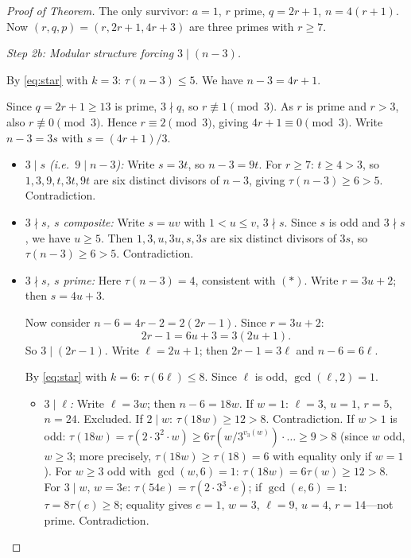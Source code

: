 \documentclass[11pt]{article}
\begin{document}
\begin{proof}[Proof of Theorem]
The only survivor: $a = 1$, $r$ prime, $q = 2r + 1$, $n = 4(r + 1)$.
Now $(r, q, p) = (r, 2r+1, 4r+3)$ are three primes with $r \ge 7$.

\medskip
\noindent\textit{Step 2b: Modular structure forcing $3 \mid (n - 3)$.}

By \eqref{eq:star} with $k = 3$: $\tau(n - 3) \le 5$.  We have $n - 3 = 4r + 1$.

Since $q = 2r + 1 \ge 13$ is prime, $3 \nmid q$, so $r \not\equiv 1 \pmod 3$.
As $r$ is prime and $r > 3$, also $r \not\equiv 0 \pmod 3$.  Hence
$r \equiv 2 \pmod 3$, giving $4r + 1 \equiv 0 \pmod 3$.
Write $n - 3 = 3s$ with $s = (4r+1)/3$.

\begin{itemize}
\item \emph{$3 \mid s$ (i.e.\ $9 \mid n - 3$):}
  Write $s = 3t$, so $n - 3 = 9t$.  For $r \ge 7$: $t \ge 4 > 3$, so
  $1, 3, 9, t, 3t, 9t$ are six distinct divisors of $n - 3$, giving
  $\tau(n-3) \ge 6 > 5$.  Contradiction.

\item \emph{$3 \nmid s$, $s$ composite:}
  Write $s = uv$ with $1 < u \le v$, $3 \nmid s$.  Since $s$ is odd and
  $3 \nmid s$, we have $u \ge 5$.
  Then $1, 3, u, 3u, s, 3s$ are six distinct divisors of $3s$, so
  $\tau(n - 3) \ge 6 > 5$.  Contradiction.

\item \emph{$3 \nmid s$, $s$ prime:}
  Here $\tau(n - 3) = 4$, consistent with $(*)$.  Write $r = 3u + 2$; then
  $s = 4u + 3$.

  Now consider $n - 6 = 4r - 2 = 2(2r - 1)$.  Since $r = 3u + 2$:
  \[
    2r - 1 = 6u + 3 = 3(2u + 1).
  \]
  So $3 \mid (2r - 1)$.  Write $\ell = 2u + 1$; then $2r - 1 = 3\ell$ and
  $n - 6 = 6\ell$.

  By \eqref{eq:star} with $k = 6$: $\tau(6\ell) \le 8$.
  Since $\ell$ is odd, $\gcd(\ell, 2) = 1$.

  \begin{itemize}
  \item \emph{$3 \mid \ell$:} Write $\ell = 3w$; then $n - 6 = 18w$.
    If $w = 1$: $\ell = 3$, $u = 1$, $r = 5$, $n = 24$.  Excluded.
    If $2 \mid w$: $\tau(18w) \ge 12 > 8$.  Contradiction.
    If $w > 1$ is odd: $\tau(18w) = \tau(2 \cdot 3^2 \cdot w) \ge 6\tau(w/3^{v_3(w)})
    \cdot \ldots \ge 9 > 8$ (since $w$ odd, $w \ge 3$; more precisely,
    $\tau(18w) \ge \tau(18) = 6$ with equality only if $w = 1$).
    For $w \ge 3$ odd with $\gcd(w, 6) = 1$: $\tau(18w) = 6\tau(w) \ge 12 > 8$.
    For $3 \mid w$, $w = 3e$: $\tau(54e) = \tau(2 \cdot 3^3 \cdot e)$; if
    $\gcd(e,6)=1$: $\tau = 8\tau(e) \ge 8$; equality gives $e = 1$, $w = 3$,
    $\ell = 9$, $u = 4$, $r = 14$---not prime.  Contradiction.


\end{itemize}
\end{itemize}
\end{proof}
\end{document}

